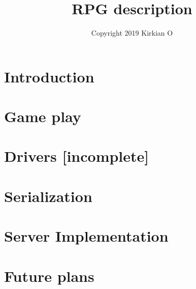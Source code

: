 \documentclass[12pt,fleqn]{article}
\title{RPG description}
\author{Copyright 2019 Kirkian O}
\begin{document}
\maketitle

\tableofcontents



\section{Introduction}
\label{sec:intro}


\section{Game play}
\label{sec:play}


\section{Drivers [incomplete]}
\label{sec:drivers}


\section{Serialization}
\label{sec:serialization}


\section{Server Implementation}
\label{sec:server-impl}


\section{Future plans}
\label{sec:future}

\end{document}
